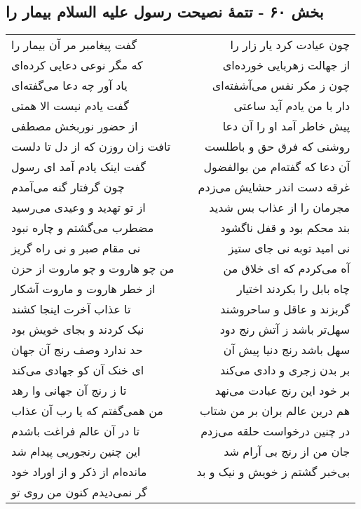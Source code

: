 \begin{center}
\section*{بخش ۶۰ - تتمهٔ نصیحت رسول علیه السلام بیمار را}
\label{sec:sh060}
\begin{longtable}{l p{0.5cm} r}
گفت پیغامبر مر آن بیمار را
&&
چون عیادت کرد یار زار را
\\
که مگر نوعی دعایی کرده‌ای
&&
از جهالت زهربایی خورده‌ای
\\
یاد آور چه دعا می‌گفته‌ای
&&
چون ز مکر نفس می‌آشفته‌ای
\\
گفت یادم نیست الا همتی
&&
دار با من یادم آید ساعتی
\\
از حضور نوربخش مصطفی
&&
پیش خاطر آمد او را آن دعا
\\
تافت زان روزن که از دل تا دلست
&&
روشنی که فرق حق و باطلست
\\
گفت اینک یادم آمد ای رسول
&&
آن دعا که گفته‌ام من بوالفضول
\\
چون گرفتار گنه می‌آمدم
&&
غرقه دست اندر حشایش می‌زدم
\\
از تو تهدید و وعیدی می‌رسید
&&
مجرمان را از عذاب بس شدید
\\
مضطرب می‌گشتم و چاره نبود
&&
بند محکم بود و قفل ناگشود
\\
نی مقام صبر و نی راه گریز
&&
نی امید توبه نی جای ستیز
\\
من چو هاروت و چو ماروت از حزن
&&
آه می‌کردم که ای خلاق من
\\
از خطر هاروت و ماروت آشکار
&&
چاه بابل را بکردند اختیار
\\
تا عذاب آخرت اینجا کشند
&&
گربزند و عاقل و ساحروشند
\\
نیک کردند و بجای خویش بود
&&
سهل‌تر باشد ز آتش رنج دود
\\
حد ندارد وصف رنج آن جهان
&&
سهل باشد رنج دنیا پیش آن
\\
ای خنک آن کو جهادی می‌کند
&&
بر بدن زجری و دادی می‌کند
\\
تا ز رنج آن جهانی وا رهد
&&
بر خود این رنج عبادت می‌نهد
\\
من همی‌گفتم که یا رب آن عذاب
&&
هم درین عالم بران بر من شتاب
\\
تا در آن عالم فراغت باشدم
&&
در چنین درخواست حلقه می‌زدم
\\
این چنین رنجوریی پیدام شد
&&
جان من از رنج بی آرام شد
\\
مانده‌ام از ذکر و از اوراد خود
&&
بی‌خبر گشتم ز خویش و نیک و بد
\\
گر نمی‌دیدم کنون من روی تو

\end{longtable}
\end{center}
